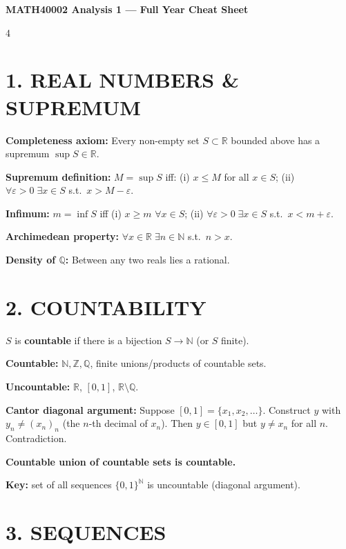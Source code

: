 \documentclass[8pt,a4paper,landscape]{extarticle}
\begin{document}
\begin{center}{\small\textbf{MATH40002 Analysis 1 --- Full Year Cheat Sheet}}\end{center}
\vspace{-4pt}
\begin{multicols}{4}

\section*{1. REAL NUMBERS \& SUPREMUM}

\textbf{Completeness axiom:} Every non-empty set $S\subset\mathbb{R}$ bounded above has a supremum $\sup S\in\mathbb{R}$.

\textbf{Supremum definition:} $M=\sup S$ iff:
(i) $x\leq M$ for all $x\in S$;
(ii) $\forall\varepsilon>0\;\exists x\in S$ s.t.\ $x>M-\varepsilon$.

\textbf{Infimum:} $m=\inf S$ iff (i) $x\geq m$ $\forall x\in S$; (ii) $\forall\varepsilon>0\;\exists x\in S$ s.t.\ $x<m+\varepsilon$.

\textbf{Archimedean property:} $\forall x\in\mathbb{R}\;\exists n\in\mathbb{N}$ s.t.\ $n>x$.

\textbf{Density of $\mathbb{Q}$:} Between any two reals lies a rational.

\section*{2. COUNTABILITY}

$S$ is \textbf{countable} if there is a bijection $S\to\mathbb{N}$ (or $S$ finite).

\textbf{Countable:} $\mathbb{N},\mathbb{Z},\mathbb{Q}$, finite unions/products of countable sets.

\textbf{Uncountable:} $\mathbb{R}$, $[0,1]$, $\mathbb{R}\setminus\mathbb{Q}$.

\textbf{Cantor diagonal argument:} Suppose $[0,1]=\{x_1,x_2,\ldots\}$. Construct $y$ with $y_n\neq(x_n)_n$ (the $n$-th decimal of $x_n$). Then $y\in[0,1]$ but $y\neq x_n$ for all $n$. Contradiction.

\textbf{Countable union of countable sets is countable.}

\textbf{Key:} set of all sequences $\{0,1\}^\mathbb{N}$ is uncountable (diagonal argument).

\section*{3. SEQUENCES}


\end{multicols}
\end{document}
